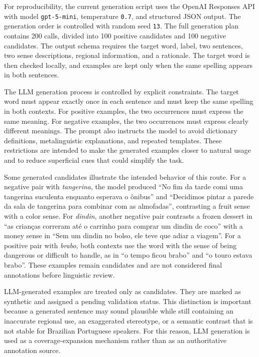 \documentclass[10pt,a4paper,twocolumn]{article}
\begin{document}
For reproducibility, the current generation script uses the OpenAI Responses API with model \texttt{gpt-5-mini}, temperature \texttt{0.7}, and structured JSON output. The generation order is controlled with random seed \texttt{13}. The full generation plan contains 200 calls, divided into 100 positive candidates and 100 negative candidates. The output schema requires the target word, label, two sentences, two sense descriptions, regional information, and a rationale. The target word is then checked locally, and examples are kept only when the same spelling appears in both sentences.

The LLM generation process is controlled by explicit constraints. The target word must appear exactly once in each sentence and must keep the same spelling in both contexts. For positive examples, the two occurrences must express the same meaning. For negative examples, the two occurrences must express clearly different meanings. The prompt also instructs the model to avoid dictionary definitions, metalinguistic explanations, and repeated templates. These restrictions are intended to make the generated examples closer to natural usage and to reduce superficial cues that could simplify the task.

Some generated candidates illustrate the intended behavior of this route. For a negative pair with \textit{tangerina}, the model produced \enquote{No fim da tarde comi uma tangerina suculenta enquanto esperava o ônibus} and \enquote{Decidimos pintar a parede da sala de tangerina para combinar com as almofadas}, contrasting a fruit sense with a color sense. For \textit{dindin}, another negative pair contrasts a frozen dessert in \enquote{as crianças correram até o carrinho para comprar um dindin de coco} with a money sense in \enquote{Sem um dindin no bolso, ele teve que adiar a viagem}. For a positive pair with \textit{brabo}, both contexts use the word with the sense of being dangerous or difficult to handle, as in \enquote{o tempo ficou brabo} and \enquote{o touro estava brabo}. These examples remain candidates and are not considered final annotations before linguistic review.

LLM-generated examples are treated only as candidates. They are marked as synthetic and assigned a pending validation status. This distinction is important because a generated sentence may sound plausible while still containing an inaccurate regional use, an exaggerated stereotype, or a semantic contrast that is not stable for Brazilian Portuguese speakers. For this reason, LLM generation is used as a coverage-expansion mechanism rather than as an authoritative annotation source.
\end{document}
